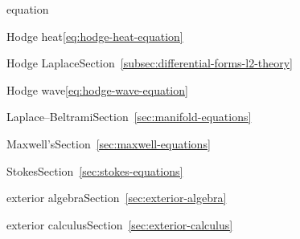 \par\noindent\hspace*{0em}\label{index:equation}{equation}

\par\noindent\hspace*{1em}\label{index:equation-hodge-heat}{Hodge heat}\quad \eqref{eq:hodge-heat-equation}

\par\noindent\hspace*{1em}\label{index:equation-hodge-laplace}{Hodge Laplace}\quad Section~\ref{subsec:differential-forms-l2-theory}

\par\noindent\hspace*{1em}\label{index:equation-hodge-wave}{Hodge wave}\quad \eqref{eq:hodge-wave-equation}

\par\noindent\hspace*{1em}\label{index:equation-laplace-beltrami}{Laplace–Beltrami}\quad Section~\ref{sec:manifold-equations}

\par\noindent\hspace*{1em}\label{index:equation-maxwell-s}{Maxwell's}\quad Section~\ref{sec:maxwell-equations}

\par\noindent\hspace*{1em}\label{index:equation-stokes}{Stokes}\quad Section~\ref{sec:stokes-equations}

\par\noindent\hspace*{0em}\label{index:exterior-algebra}{exterior algebra}\quad Section~\ref{sec:exterior-algebra}

\par\noindent\hspace*{0em}\label{index:exterior-calculus}{exterior calculus}\quad Section~\ref{sec:exterior-calculus}


